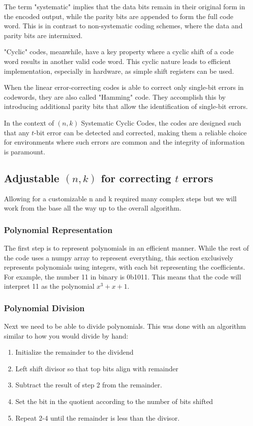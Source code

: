 \documentclass{article}
\begin{document}
The term "systematic" implies that the data bits remain in their original form in the encoded output, while the parity bits are appended to form the full code word. This is in contrast to non-systematic coding schemes, where the data and parity bits are intermixed.

"Cyclic" codes, meanwhile, have a key property where a cyclic shift of a code word results in another valid code word. This cyclic nature leads to efficient implementation, especially in hardware, as simple shift registers can be used.

When the linear error-correcting codes is able to correct only single-bit errors in codewords, they are also called "Hamming" code. They accomplish this by introducing additional parity bits that allow the identification of single-bit errors.

In the context of $(n,k)$ Systematic Cyclic Codes, the codes are designed such that any $t$-bit error can be detected and corrected, making them a reliable choice for environments where such errors are common and the integrity of information is paramount.


\subsection{Adjustable $(n,k)$ for correcting $t$ errors}
\label{sec:adjustable-nk}
Allowing for a customizable n and k required many complex steps but we will work from the base all the way up to the overall algorithm.
\subsubsection{Polynomial Representation}
The first step is to represent polynomials in an efficient manner. While the rest of the code uses a numpy array to represent everything, this section exclusively represents polynomials using integers, with each bit representing the coefficients. For example, the number 11 in binary is 0b1011. This means that the code will interpret 11 as the polynomial $x^3+x+1$.
\subsubsection{Polynomial Division}
Next we need to be able to divide polynomials. This was done with an algorithm similar to how you would divide by hand:
\begin{enumerate}
    \item Initialize the remainder to the dividend
    \item Left shift divisor so that top bits align with remainder
    \item Subtract the result of step 2 from the remainder.
    \item Set the bit in the quotient according to the number of bits shifted
    \item Repeat 2-4 until the remainder is less than the divisor.
\end{enumerate}
\end{document}
